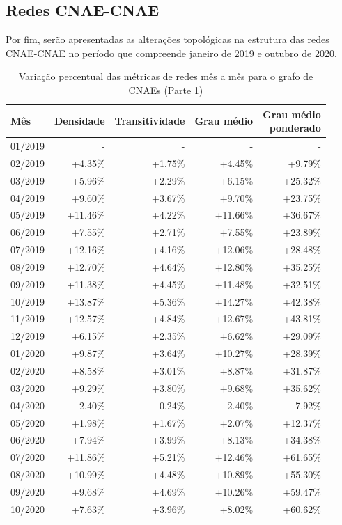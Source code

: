 \subsection{Redes CNAE-CNAE}
\label{section:alteracoes-topologicas:cnae}

Por fim, serão apresentadas as alterações topológicas na estrutura das redes CNAE-CNAE no período que compreende janeiro de 2019 e outubro de 2020.

\begin{table}[htb]
\centering
\caption{Variação percentual das métricas de redes mês a mês para o grafo de CNAEs (Parte 1)}
\label{tab:metricas-redes-pandemia:grafo-mensal-por-cnae1}
\begin{tabular}{l|rrrr}
\toprule
Mês & Densidade & Transitividade & Grau médio & \shortstack{Grau médio\\ponderado} \\
\midrule
01/2019 & - & - & - & - \\
02/2019 &  +4.35\% &  +1.75\% &  +4.45\% &  +9.79\% \\
03/2019 &  +5.96\% &  +2.29\% &  +6.15\% & +25.32\% \\
04/2019 &  +9.60\% &  +3.67\% &  +9.70\% & +23.75\% \\
05/2019 & +11.46\% &  +4.22\% & +11.66\% & +36.67\% \\
06/2019 &  +7.55\% &  +2.71\% &  +7.55\% & +23.89\% \\
07/2019 & +12.16\% &  +4.16\% & +12.06\% & +28.48\% \\
08/2019 & +12.70\% &  +4.64\% & +12.80\% & +35.25\% \\
09/2019 & +11.38\% &  +4.45\% & +11.48\% & +32.51\% \\
10/2019 & +13.87\% &  +5.36\% & +14.27\% & +42.38\% \\
11/2019 & +12.57\% &  +4.84\% & +12.67\% & +43.81\% \\
12/2019 &  +6.15\% &  +2.35\% &  +6.62\% & +29.09\% \\
01/2020 &  +9.87\% &  +3.64\% & +10.27\% & +28.39\% \\
02/2020 &  +8.58\% &  +3.01\% &  +8.87\% & +31.87\% \\
03/2020 &  +9.29\% &  +3.80\% &  +9.68\% & +35.62\% \\
04/2020 &  -2.40\% &  -0.24\% &  -2.40\% &  -7.92\% \\
05/2020 &  +1.98\% &  +1.67\% &  +2.07\% & +12.37\% \\
06/2020 &  +7.94\% &  +3.99\% &  +8.13\% & +34.38\% \\
07/2020 & +11.86\% &  +5.21\% & +12.46\% & +61.65\% \\
08/2020 & +10.99\% &  +4.48\% & +10.89\% & +55.30\% \\
09/2020 &  +9.68\% &  +4.69\% & +10.26\% & +59.47\% \\
10/2020 &  +7.63\% &  +3.96\% &  +8.02\% & +60.62\% \\
\bottomrule
\end{tabular}
\fdadospesquisa
\end{table}

